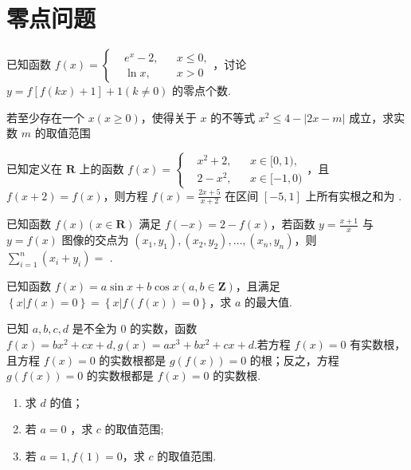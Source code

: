 \documentclass[a4paper , final]{ctexart}
\newenvironment{problem}[1]{%
  \item #1
  \par
  \vspace{8cm}
}{}
\begin{document}
\newpage
\section*{零点问题}

\begin{problems}
    \begin{problem}
    {
    已知函数 $ f(x) = \left\{\begin{aligned} &e^x-2,&&x\leq 0,\\ &\ln{x} ,&&x>0\end{aligned}\right.$，讨论 $ y = f\left[f(kx)+1\right]+1(k\neq 0)$ 的零点个数.
    }
    \end{problem}

    \begin{problem}
    {
    若至少存在一个 $ x(x\geq 0)$，使得关于 $ x$ 的不等式 $x^2\leq 4-\left\vert 2x-m \right\vert$ 成立，求实数 $m$ 的取值范围
    }
    \end{problem}

    \begin{problem}
    {
    已知定义在 $\mathbf{R}$ 上的函数 $ f(x) = \left\{\begin{aligned}&x^2+2,&&x\in [0,1),\\&2-x^2,&& x\in[-1,0)\end{aligned}\right.$，且 $ f(x+2) = f(x)$，则方程 $ f(x) = \frac{2x+5}{x+2}$ 在区间 $ [-5,1]$ 上所有实根之和为 \underline{\hspace{1.5cm}}.
    }
    \end{problem}

    \begin{problem}
    {
    已知函数 $f(x)(x\in \mathbf{R})$ 满足 $ f(-x) = 2-f(x)$，若函数 $ y = \frac{x+1}{x}$ 与 $ y = f(x)$ 图像的交点为 $ (x_1,y_1),(x_2,y_2),\ldots , (x_n,y_n)$，则 $\sum_{i = 1}^n(x_i+y_i)=$ \underline{\hspace{1.5cm}}.
    }
    \end{problem}

    \begin{problem}
    {
    已知函数 $ f(x)= a\sin{x}+b\cos{x}(a,b\in \mathbf{Z})$，且满足 $ \left\{x\vert f(x)=0\right\} = \left\{x\vert f(f(x))=0\right\}$，求 $a$ 的最大值.
    }
    \end{problem}


    \newpage
    \begin{problem}
    {
    已知 $ a,b,c,d$ 是不全为 $ 0$ 的实数，函数 $ f(x) = bx^2+cx+d,g(x) = ax^3+bx^2+cx+d$.若方程 $ f(x) = 0$ 有实数根，且方程 $ f(x) = 0$ 的实数根都是 $ g(f(x)) = 0$ 的根；反之，方程 $ g(f(x)) = 0$ 的实数根都是 $ f(x) = 0$ 的实数根.
    \begin{enumerate}[label=(\arabic*)]
        \item 求 $ d$ 的值；
        \item 若 $ a =0$ ，求 $ c$ 的取值范围;
        \item 若 $ a = 1,f(1) = 0$，求 $ c$ 的取值范围.
    \end{enumerate}
    }
    \vspace{4cm}
    \end{problem}


\end{problems}
\end{document}
